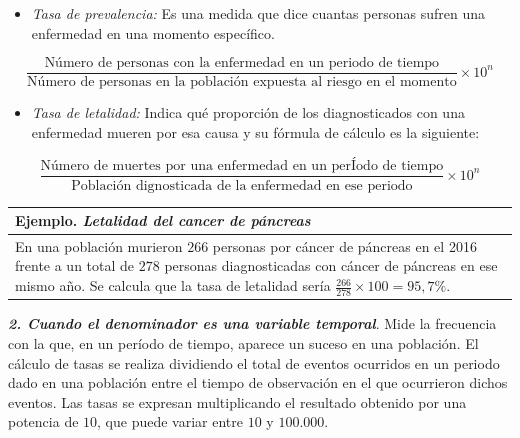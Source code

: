 \documentclass[
]{book}
\providecommand{\tightlist}{%
  \setlength{\itemsep}{0pt}\setlength{\parskip}{0pt}}
\begin{document}
\begin{itemize}
\tightlist
\item
  \emph{Tasa de prevalencia:} Es una medida que dice cuantas personas sufren una enfermedad en una momento específico.
\end{itemize}

\[\begin{equation}
\frac{\text{Número de personas con la enfermedad en un periodo de tiempo}}{\text{Número de personas en la población expuesta al riesgo
en el momento}}\times 10^{n}
\end{equation}\]

\begin{itemize}
\tightlist
\item
  \emph{Tasa de letalidad:} Indica qué proporción de los diagnosticados con una enfermedad mueren por esa causa y su fórmula de cálculo es la siguiente:
\end{itemize}

\[\begin{equation}
\frac{\text{Número de muertes por una enfermedad en un perÍodo de tiempo}}{\text{Población dignosticada de la enfermedad en ese periodo}}\times 10^n
\end{equation}\]

\begin{longtable}[]{@{}l@{}}
\toprule
\begin{minipage}[b]{0.97\columnwidth}\raggedright
Ejemplo. \emph{Letalidad del cancer de páncreas}\strut
\end{minipage}\tabularnewline
\midrule
\endhead
\begin{minipage}[t]{0.97\columnwidth}\raggedright
En una población murieron \(266\) personas por cáncer de páncreas en el 2016 frente a un total de \(278\) personas diagnosticadas con cáncer de páncreas en ese mismo año. Se calcula que la tasa de letalidad sería \(\frac{266}{278}\times 100=95,7\%\).\strut
\end{minipage}\tabularnewline
\bottomrule
\end{longtable}

\textbf{\emph{2. Cuando el denominador es una variable temporal}}. Mide la frecuencia con la que, en un período de tiempo, aparece un suceso en una población. El cálculo de tasas se realiza dividiendo el total de eventos ocurridos en un periodo dado en una población entre el tiempo de observación en el que ocurrieron dichos eventos. Las tasas se expresan multiplicando el resultado obtenido por una potencia de \(10\), que puede variar entre \(10\) y \(100.000\).
\end{document}
